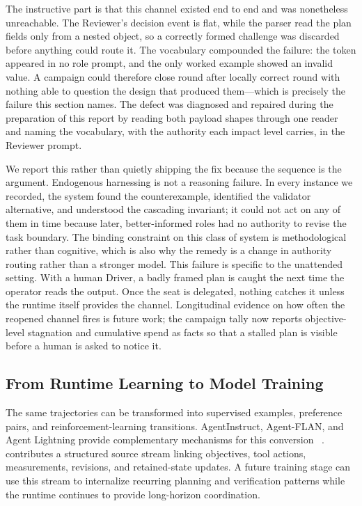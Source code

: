 The instructive part is that this channel existed end to end and was nonetheless
unreachable. The Reviewer's decision event is flat, while the parser read the plan
fields only from a nested object, so a correctly formed challenge was discarded
before anything could route it. The vocabulary compounded the failure: the token
 appeared in no role prompt, and the only worked example showed an
invalid value. A campaign could therefore close round after locally correct round
with nothing able to question the design that produced them---which is precisely the
failure this section names. The defect was diagnosed and repaired during the
preparation of this report by reading both payload shapes through one reader and
naming the vocabulary, with the authority each impact level carries, in the Reviewer
prompt.

We report this rather than quietly shipping the fix because the sequence is the
argument. Endogenous harnessing is not a reasoning failure. In every instance we
recorded, the system found the counterexample, identified the validator alternative,
and understood the cascading invariant; it could not act on any of them in time
because later, better-informed roles had no authority to revise the task boundary.
The binding constraint on this class of system is methodological rather than
cognitive, which is also why the remedy is a change in authority routing rather than
a stronger model. This failure is specific to the unattended
setting. With a human Driver, a badly framed plan is caught the next time the
operator reads the output. Once the seat is delegated, nothing catches it unless the
runtime itself provides the channel. Longitudinal evidence on how often the reopened
channel fires is future work; the campaign tally now reports objective-level
stagnation and cumulative spend as facts so that a stalled plan is visible before a
human is asked to notice it.

\subsection{From Runtime Learning to Model Training}
\label{sec:runtime-to-training}

The same trajectories can be transformed into supervised examples, preference
pairs, and reinforcement-learning transitions. AgentInstruct, Agent-FLAN, and
Agent Lightning provide complementary mechanisms for this conversion
~\citep{mitra2024agentinstruct,chen2024agentflan,luo2025agentlightning}.
\systemname contributes a structured source stream linking objectives, tool actions,
measurements, revisions, and retained-state updates. A future training stage can use
this stream to internalize recurring planning and verification patterns while the
runtime continues to provide long-horizon coordination.

